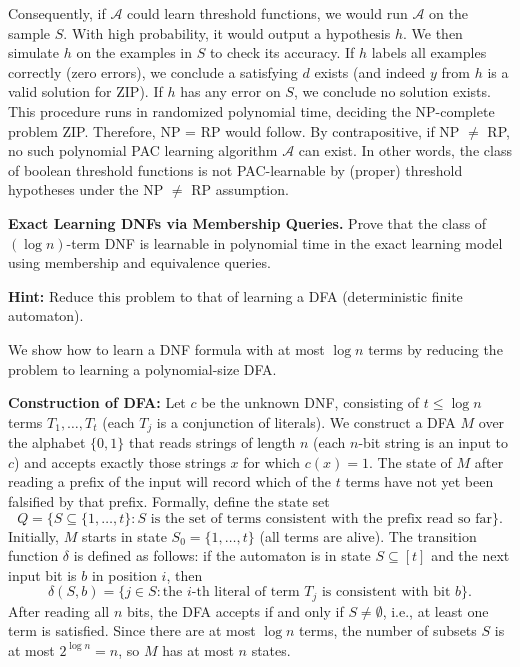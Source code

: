 \documentclass[11pt]{article}
\DeclareMathOperator{\1}{\mathbbm{1}}
\begin{document}
Consequently, if $\mathcal{A}$ could learn threshold functions, we would run $\mathcal{A}$ on the sample $S$. With high probability, it would output a hypothesis $h$. We then simulate $h$ on the examples in $S$ to check its accuracy. If $h$ labels all examples correctly (zero errors), we conclude a satisfying $d$ exists (and indeed $y$ from $h$ is a valid solution for ZIP). If $h$ has any error on $S$, we conclude no solution exists. This procedure runs in randomized polynomial time, deciding the NP-complete problem ZIP. Therefore, NP = RP would follow. By contrapositive, if NP $\neq$ RP, no such polynomial PAC learning algorithm $\mathcal{A}$ can exist. In other words, the class of boolean threshold functions is not PAC-learnable by (proper) threshold hypotheses under the NP $\neq$ RP assumption.

\begin{problem}[15 pts] \textbf{Exact Learning DNFs via Membership Queries.} Prove that the class of $(\log n)$-term DNF is learnable in polynomial time in the exact learning model using membership and equivalence queries.

\textbf{Hint:} Reduce this problem to that of learning a DFA (deterministic finite automaton).
\end{problem}

We show how to learn a DNF formula with at most $\log n$ terms by reducing the problem to learning a polynomial-size DFA.

\textbf{Construction of DFA:} Let $c$ be the unknown DNF, consisting of $t \le \log n$ terms $T_1,\dots,T_t$ (each $T_j$ is a conjunction of literals). We construct a DFA $M$ over the alphabet $\{0,1\}$ that reads strings of length $n$ (each $n$-bit string is an input to $c$) and accepts exactly those strings $x$ for which $c(x)=1$. The state of $M$ after reading a prefix of the input will record which of the $t$ terms have not yet been falsified by that prefix. Formally, define the state set 
\[
Q = \{ S \subseteq \{1,\ldots,t\} : S \text{ is the set of terms consistent with the prefix read so far}\}.
\] 
Initially, $M$ starts in state $S_0 = \{1,\ldots,t\}$ (all terms are alive). The transition function $\delta$ is defined as follows: if the automaton is in state $S \subseteq [t]$ and the next input bit is $b$ in position $i$, then 
\[
\delta(S, b) = \{ j \in S : \text{the $i$-th literal of term $T_j$ is consistent with bit $b$}\}.
\] 
After reading all $n$ bits, the DFA accepts if and only if $S \neq \emptyset$, i.e., at least one term is satisfied. Since there are at most $\log n$ terms, the number of subsets $S$ is at most $2^{\log n} = n$, so $M$ has at most $n$ states.
\end{document}
